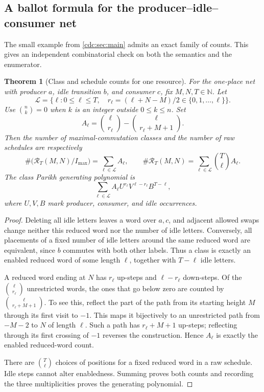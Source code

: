 \documentclass[11pt,a4paper]{article}
\newtheorem{theorem}{Theorem}[section]
\theoremstyle{definition}
\theoremstyle{remark}
\newcommand{\N}{\mathbb N}
\begin{document}
\subsection{A ballot formula for the producer--idle--consumer net}
The small example from \cref{cdc:sec:main} admits an exact family of counts. This gives an independent combinatorial check on both the semantics and the enumerator.

\begin{theorem}[Class and schedule counts for one resource]\label{cdc:thm:ballot}
For the one-place net with producer $a$, idle transition $b$, and consumer $c$, fix $M,N,T\in\N$. Let
\[
\mathcal L=\{\ell:0\le\ell\le T,\quad
r_\ell=(\ell+N-M)/2\in\{0,1,\ldots,\ell\}\}.
\]
Use $\binom nk=0$ when $k$ is an integer outside $0\le k\le n$. Set
\[
A_\ell=\binom{\ell}{r_\ell}
       -\binom{\ell}{r_\ell+M+1}.
\]
Then the number of maximal-commutation classes and the number of raw schedules are respectively
\begin{equation}\label{cdc:eq:ballot}
\#\bigl(\mathcal R_T(M,N)/I_{\max}\bigr)=\sum_{\ell\in\mathcal L}A_\ell,
\qquad
\#\mathcal R_T(M,N)=\sum_{\ell\in\mathcal L}\binom T\ell A_\ell.
\end{equation}
The class Parikh generating polynomial is
\[
\sum_{\ell\in\mathcal L}
 A_\ell U^{r_\ell}V^{\ell-r_\ell}B^{T-\ell},
\]
where $U,V,B$ mark producer, consumer, and idle occurrences.
\end{theorem}
\begin{proof}
Deleting all idle letters leaves a word over $a,c$, and adjacent allowed swaps change neither this reduced word nor the number of idle letters. Conversely, all placements of a fixed number of idle letters around the same reduced word are equivalent, since $b$ commutes with both other labels. Thus a class is exactly an enabled reduced word of some length $\ell$, together with $T-\ell$ idle letters.

A reduced word ending at $N$ has $r_\ell$ up-steps and $\ell-r_\ell$ down-steps. Of the $\binom\ell{r_\ell}$ unrestricted words, the ones that go below zero are counted by $\binom\ell{r_\ell+M+1}$. To see this, reflect the part of the path from its starting height $M$ through its first visit to $-1$. This maps it bijectively to an unrestricted path from $-M-2$ to $N$ of length $\ell$. Such a path has $r_\ell+M+1$ up-steps; reflecting through its first crossing of $-1$ reverses the construction. Hence $A_\ell$ is exactly the enabled reduced-word count.

There are $\binom T\ell$ choices of positions for a fixed reduced word in a raw schedule. Idle steps cannot alter enabledness. Summing proves both counts and recording the three multiplicities proves the generating polynomial.
\end{proof}
\end{document}
